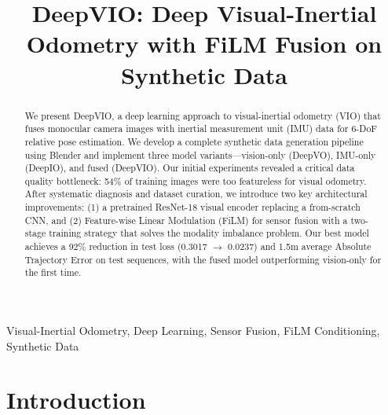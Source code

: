 \documentclass[conference]{IEEEtran}
\begin{document}
\title{DeepVIO: Deep Visual-Inertial Odometry with FiLM Fusion on Synthetic Data}

\author{
\and
{}
\and 
{}
}

\maketitle

\begin{abstract}
We present DeepVIO, a deep learning approach to visual-inertial odometry (VIO) that fuses monocular camera images with inertial measurement unit (IMU) data for 6-DoF relative pose estimation. We develop a complete synthetic data generation pipeline using Blender and implement three model variants---vision-only (DeepVO), IMU-only (DeepIO), and fused (DeepVIO). Our initial experiments revealed a critical data quality bottleneck: 54\% of training images were too featureless for visual odometry. After systematic diagnosis and dataset curation, we introduce two key architectural improvements: (1) a pretrained ResNet-18 visual encoder replacing a from-scratch CNN, and (2) Feature-wise Linear Modulation (FiLM) for sensor fusion with a two-stage training strategy that solves the modality imbalance problem. Our best model achieves a 92\% reduction in test loss (0.3017 $\to$ 0.0237) and 1.5m average Absolute Trajectory Error on test sequences, with the fused model outperforming vision-only for the first time.
\end{abstract}

\begin{IEEEkeywords}
Visual-Inertial Odometry, Deep Learning, Sensor Fusion, FiLM Conditioning, Synthetic Data
\end{IEEEkeywords}

\section{Introduction}
\end{document}
